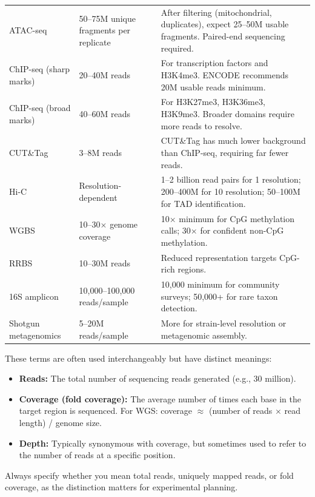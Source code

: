 \begin{longtable}{@{}p{3.4cm} p{4.4cm} p{6.0cm}@{}}
\addlinespace
ATAC-seq & 50--75M unique fragments per replicate & After filtering (mitochondrial, duplicates), expect 25--50M usable fragments. Paired-end sequencing required. \\
\addlinespace
ChIP-seq (sharp marks) & 20--40M reads & For transcription factors and H3K4me3. ENCODE recommends 20M usable reads minimum. \\
\addlinespace
ChIP-seq (broad marks) & 40--60M reads & For H3K27me3, H3K36me3, H3K9me3. Broader domains require more reads to resolve. \\
\addlinespace
CUT\&Tag & 3--8M reads & CUT\&Tag has much lower background than ChIP-seq, requiring far fewer reads. \\
\addlinespace
Hi-C & Resolution-dependent & 1--2 billion read pairs for 1\kilobase{} resolution; 200--400M for 10\kilobase{} resolution; 50--100M for TAD identification. \\
\addlinespace
WGBS & 10--30$\times$ genome coverage & 10$\times$ minimum for CpG methylation calls; 30$\times$ for confident non-CpG methylation. \\
\addlinespace
RRBS & 10--30M reads & Reduced representation targets CpG-rich regions. \\
\addlinespace
16S amplicon & 10,000--100,000 reads/sample & 10,000 minimum for community surveys; 50,000+ for rare taxon detection. \\
\addlinespace
Shotgun metagenomics & 5--20M reads/sample & More for strain-level resolution or metagenomic assembly. \\
\end{longtable}

\begin{warningbox}[title={Depth vs Coverage vs Reads}]
These terms are often used interchangeably but have distinct meanings:
\begin{itemize}[nosep]
  \item \textbf{Reads:} The total number of sequencing reads generated (e.g., 30 million).
  \item \textbf{Coverage (fold coverage):} The average number of times each base in the target region is sequenced. For WGS: coverage $\approx$ (number of reads $\times$ read length) / genome size.
  \item \textbf{Depth:} Typically synonymous with coverage, but sometimes used to refer to the number of reads at a specific position.
\end{itemize}
Always specify whether you mean total reads, uniquely mapped reads, or fold coverage, as the distinction matters for experimental planning.
\end{warningbox}

